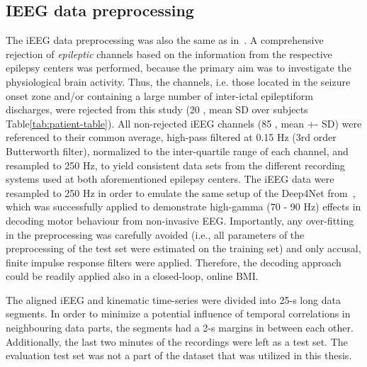 \subsection{IEEG data preprocessing}\label{subsec:ieeg-data-preprocessing}
The iEEG data preprocessing was also the same as in~\cite{Hammer-2021}.
A comprehensive rejection of \textit{epileptic} channels based on the information from the respective epilepsy centers was performed, because the primary aim was to investigate the physiological brain activity.
Thus, the channels, i.e. those located in the seizure onset zone and/or containing a large number of inter-ictal epileptiform discharges, were rejected from this study (20 , mean \pm SD over subjects Table\ref{tab:patient-table}).
All non-rejected iEEG channels (85 , mean +- SD) were referenced to their common average, high-pass filtered at 0.15 Hz (3rd order Butterworth filter), normalized to the inter-quartile range of each channel, and resampled to 250 Hz, to yield consistent data sets from the different recording systems used at both aforementioned epilepsy centers.
The iEEG data were resampled to 250 Hz in order to emulate the same setup of the Deep4Net from~\cite{schirrmeister-deep-2017}, which was successfully applied to demonstrate high-gamma (70 - 90 Hz) effects in decoding motor behaviour from non-invasive EEG. Importantly, any over-fitting in the preprocessing was carefully avoided (i.e., all parameters of the preprocessing of the test set were estimated on the training set) and only accusal, finite impulse response filters were applied.
Therefore, the decoding approach could be readily applied also in a closed-loop, online BMI.

The aligned iEEG and kinematic time-series were divided into 25-s long data segments.
In order to minimize a potential influence of temporal correlations in neighbouring data parts, the segments had a 2-s margins in between each other. Additionally, the last two minutes of the recordings were left as a test set. The evaluation test set was not a part of the dataset that was utilized in this thesis.

